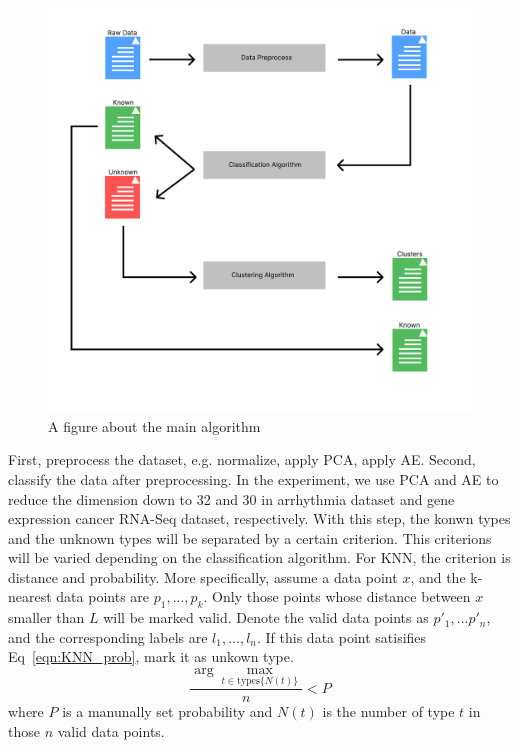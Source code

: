 \documentclass[twocolumn,10pt]{article}
\begin{document}
  \begin{figure}[htb]
    \centering
    \includegraphics[scale=0.20]{assets/Main_Algo.pdf}
    \caption{A figure about the main algorithm}
    \label{fig:Main_Algo}
  \end{figure}

  First, preprocess the dataset, e.g. normalize, apply PCA, apply AE. Second, classify the data after preprocessing. 
  In the experiment, we use PCA and AE to reduce the dimension down to 32 and 30 in arrhythmia dataset and gene 
  expression cancer RNA-Seq dataset, respectively. 
  With this step, the konwn types and the unknown types will be separated by a certain criterion. This criterions will 
  be varied depending on the classification algorithm. For KNN, the criterion is distance and probability. More specifically, 
  assume a data point $x$, and the k-nearest data points are $p_1,...,p_k$. Only those points whose distance between 
  $x$ smaller than $L$ will be marked valid. Denote the valid data points as $p'_1,...p'_n$, and the corresponding 
  labels are $l_1,...,l_n$. If this data point satisifies Eq~\ref{eqn:KNN_prob}, mark it as unkown type.
  \begin{equation}
    \label{eqn:KNN_prob}
    \frac{\arg\max_{t\in\text{types}\{N(t)\}}}{n}<P
  \end{equation}
  where $P$ is a manunally set probability and $N(t)$ is the number of type $t$ in those $n$ valid data points.
  
\end{document}
